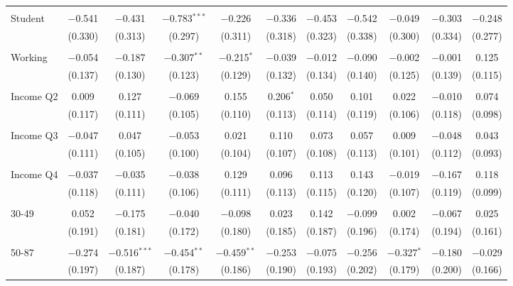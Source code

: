 \begin{tabular}{@{\extracolsep{5pt}}lcccccccccc}
  & & & & & & & & & & \\ 
 Student & $-$0.541 & $-$0.431 & $-$0.783$^{***}$ & $-$0.226 & $-$0.336 & $-$0.453 & $-$0.542 & $-$0.049 & $-$0.303 & $-$0.248 \\ 
  & (0.330) & (0.313) & (0.297) & (0.311) & (0.318) & (0.323) & (0.338) & (0.300) & (0.334) & (0.277) \\ 
  & & & & & & & & & & \\ 
 Working & $-$0.054 & $-$0.187 & $-$0.307$^{**}$ & $-$0.215$^{*}$ & $-$0.039 & $-$0.012 & $-$0.090 & $-$0.002 & $-$0.001 & 0.125 \\ 
  & (0.137) & (0.130) & (0.123) & (0.129) & (0.132) & (0.134) & (0.140) & (0.125) & (0.139) & (0.115) \\ 
  & & & & & & & & & & \\ 
 Income Q2 & 0.009 & 0.127 & $-$0.069 & 0.155 & 0.206$^{*}$ & 0.050 & 0.101 & 0.022 & $-$0.010 & 0.074 \\ 
  & (0.117) & (0.111) & (0.105) & (0.110) & (0.113) & (0.114) & (0.119) & (0.106) & (0.118) & (0.098) \\ 
  & & & & & & & & & & \\ 
 Income Q3 & $-$0.047 & 0.047 & $-$0.053 & 0.021 & 0.110 & 0.073 & 0.057 & 0.009 & $-$0.048 & 0.043 \\ 
  & (0.111) & (0.105) & (0.100) & (0.104) & (0.107) & (0.108) & (0.113) & (0.101) & (0.112) & (0.093) \\ 
  & & & & & & & & & & \\ 
 Income Q4 & $-$0.037 & $-$0.035 & $-$0.038 & 0.129 & 0.096 & 0.113 & 0.143 & $-$0.019 & $-$0.167 & 0.118 \\ 
  & (0.118) & (0.111) & (0.106) & (0.111) & (0.113) & (0.115) & (0.120) & (0.107) & (0.119) & (0.099) \\ 
  & & & & & & & & & & \\ 
 30-49 & 0.052 & $-$0.175 & $-$0.040 & $-$0.098 & 0.023 & 0.142 & $-$0.099 & 0.002 & $-$0.067 & 0.025 \\ 
  & (0.191) & (0.181) & (0.172) & (0.180) & (0.185) & (0.187) & (0.196) & (0.174) & (0.194) & (0.161) \\ 
  & & & & & & & & & & \\ 
 50-87 & $-$0.274 & $-$0.516$^{***}$ & $-$0.454$^{**}$ & $-$0.459$^{**}$ & $-$0.253 & $-$0.075 & $-$0.256 & $-$0.327$^{*}$ & $-$0.180 & $-$0.029 \\ 
  & (0.197) & (0.187) & (0.178) & (0.186) & (0.190) & (0.193) & (0.202) & (0.179) & (0.200) & (0.166) \\ 

\end{tabular}
